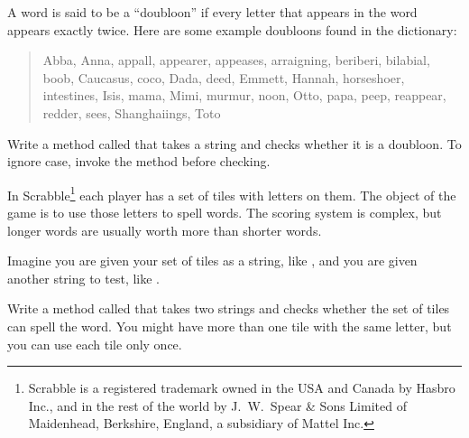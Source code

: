 \begin{exercise}  %
\label{doubloon}


A word is said to be a ``doubloon'' if every letter that appears in the word appears exactly twice.
Here are some example doubloons found in the dictionary:

\begin{quote}
Abba, Anna, appall, appearer, appeases, arraigning, beriberi, bilabial, boob, Caucasus, coco, Dada, deed, Emmett, Hannah, horseshoer, intestines, Isis, mama, Mimi, murmur, noon, Otto, papa, peep, reappear, redder, sees, Shanghaiings, Toto
\end{quote}

Write a method called  that takes a string and checks whether it is a doubloon.
To ignore case, invoke the  method before checking.
\end{exercise}


\begin{exercise}  %


In Scrabble\footnote{Scrabble is a registered trademark owned in the USA and Canada by Hasbro Inc., and in the rest of the world by J.\ W.\ Spear \& Sons Limited of Maidenhead, Berkshire, England, a subsidiary of Mattel Inc.} each player has a set of tiles with letters on them.
The object of the game is to use those letters to spell words.
The scoring system is complex, but longer words are usually worth more than shorter words.


Imagine you are given your set of tiles as a string, like , and you are given another string to test, like .

Write a method called  that takes two strings and checks whether the set of tiles can spell the word.
You might have more than one tile with the same letter, but you can use each tile only once.

\end{exercise}
